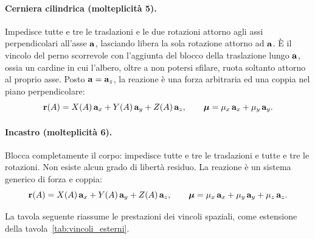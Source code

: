 \paragraph{Cerniera cilindrica (molteplicità 5).}
Impedisce tutte e tre le traslazioni e le due rotazioni
attorno agli assi perpendicolari all'asse $\mathbf{a}$,
lasciando libera la sola rotazione attorno ad $\mathbf{a}$. È
il vincolo del perno scorrevole con l'aggiunta del
blocco della traslazione lungo $\mathbf{a}$, ossia un cardine
in cui l'albero, oltre a non potersi sfilare, ruota
soltanto attorno al proprio asse. Posto $\mathbf{a} = \mathbf{a}_z$,
la reazione è una forza arbitraria ed una coppia nel
piano perpendicolare:
\begin{equation}
	\mathbf{r}(A) = X(A)\,\mathbf{a}_x + Y(A)\,\mathbf{a}_y + Z(A)\,\mathbf{a}_z,
	\qquad
	\bm{\mu} = \mu_x\,\mathbf{a}_x + \mu_y\,\mathbf{a}_y.
\end{equation}

\paragraph{Incastro (molteplicità 6).}
Blocca completamente il corpo: impedisce tutte e tre
le traslazioni e tutte e tre le rotazioni. Non esiste
alcun grado di libertà residuo. La reazione è un
sistema generico di forza e coppia:
\begin{equation}
	\mathbf{r}(A) = X(A)\,\mathbf{a}_x + Y(A)\,\mathbf{a}_y + Z(A)\,\mathbf{a}_z,
	\qquad
	\bm{\mu} = \mu_x\,\mathbf{a}_x + \mu_y\,\mathbf{a}_y +
	\mu_z\,\mathbf{a}_z.
\end{equation}

\medskip

\noindent
La tavola seguente riassume le prestazioni dei vincoli
spaziali, come estensione della
tavola~\ref{tab:vincoli_esterni}.

